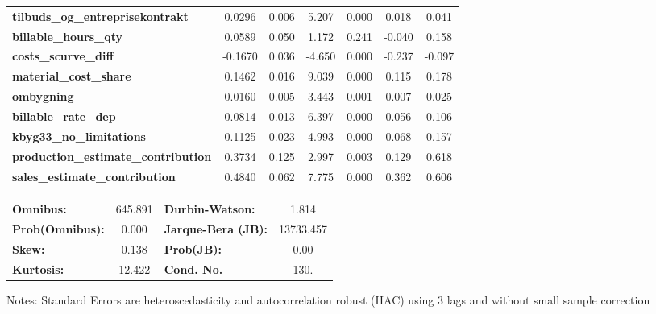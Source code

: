 \begin{center}
\begin{tabular}{lcccccc}
\textbf{tilbuds\_og\_entreprisekontrakt}    &       0.0296  &        0.006     &     5.207  &         0.000        &        0.018    &        0.041     \\
\textbf{billable\_hours\_qty}               &       0.0589  &        0.050     &     1.172  &         0.241        &       -0.040    &        0.158     \\
\textbf{costs\_scurve\_diff}                &      -0.1670  &        0.036     &    -4.650  &         0.000        &       -0.237    &       -0.097     \\
\textbf{material\_cost\_share}              &       0.1462  &        0.016     &     9.039  &         0.000        &        0.115    &        0.178     \\
\textbf{ombygning}                          &       0.0160  &        0.005     &     3.443  &         0.001        &        0.007    &        0.025     \\
\textbf{billable\_rate\_dep}                &       0.0814  &        0.013     &     6.397  &         0.000        &        0.056    &        0.106     \\
\textbf{kbyg33\_no\_limitations}            &       0.1125  &        0.023     &     4.993  &         0.000        &        0.068    &        0.157     \\
\textbf{production\_estimate\_contribution} &       0.3734  &        0.125     &     2.997  &         0.003        &        0.129    &        0.618     \\
\textbf{sales\_estimate\_contribution}      &       0.4840  &        0.062     &     7.775  &         0.000        &        0.362    &        0.606     \\
\bottomrule
\end{tabular}
\begin{tabular}{lclc}
\textbf{Omnibus:}       & 645.891 & \textbf{  Durbin-Watson:     } &     1.814  \\
\textbf{Prob(Omnibus):} &   0.000 & \textbf{  Jarque-Bera (JB):  } & 13733.457  \\
\textbf{Skew:}          &   0.138 & \textbf{  Prob(JB):          } &      0.00  \\
\textbf{Kurtosis:}      &  12.422 & \textbf{  Cond. No.          } &      130.  \\
\bottomrule
\end{tabular}
\end{center}

Notes: \newline
 [1] Standard Errors are heteroscedasticity and autocorrelation robust (HAC) using 3 lags and without small sample correction